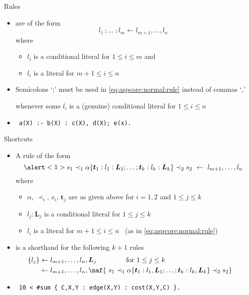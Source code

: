\begin{frame}{Rules}
  \begin{itemize}
  \item {} are of the form
    \begin{equation}
      \label{eq:aspcore:normal:rule}
       l_1\,;\dots\;;l_m\leftarrow  l_{m+1},\dots, l_n
    \end{equation}
    where
    \begin{itemize}
    \item $l_i$ is a conditional literal for $1\leq i\leq m$ and
    \item $l_i$ is a literal for $m+1\leq i\leq n$
    \end{itemize}
    \medskip
  \item<2->  Semicolons `;' must be used in \eqref{eq:aspcore:normal:rule} instead of commas `,' 
    \par whenever some $l_i$ is a (genuine) conditional literal for $1\leq i\leq n$
  \item<3->  \  \texttt{a(X) :- b(X) : c(X), d(X)\alert{;} e(x).}
  \end{itemize}
\end{frame}
\begin{frame}{Shortcuts}
  \begin{itemize}
  \item A rule of the form
    \[
    \alert<1>{s_1\prec_1\alpha\{\boldsymbol{t}_1:l_1:\boldsymbol{L}_1;\dots;\boldsymbol{t}_k:l_k:\boldsymbol{L}_k\}\prec_2 s_2}
    \ \leftarrow \ 
     l_{m+1},\dots, l_n
    \]
    where
    \begin{itemize}
    \item $\alpha$, $\prec_i$, $s_i$, $\boldsymbol{t}_j$ are as given above for $i=1,2$ and $1\leq j\leq k$
    \item $l_j:\boldsymbol{L}_j$ is a conditional literal for $1\leq j\leq k$
    \item $l_i$ is a literal for $m+1\leq i\leq n$ \ (as in \eqref{eq:aspcore:normal:rule})
    \end{itemize}
    \medskip
  \item<2->[] is a shorthand for the following $k+1$ rules
    \begin{align*}\hspace{-10pt}
      \{ l_j\}&\leftarrow  l_{m+1},\dots, l_n,\boldsymbol{L}_j\qquad\qquad\text{ for }1\leq j\leq k\\
                &\leftarrow  l_{m+1},\dots, l_n,\naf{~s_1\prec_1\alpha\{\boldsymbol{t}_1:l_1,\boldsymbol{L}_1;\dots;\boldsymbol{t}_k:l_k,\boldsymbol{L}_k\}\prec_2 s_2}
      \end{align*}
  \item<3->  \ 
    \texttt{10 < \#\texttt{sum} \{ C,X,Y : edge(X,Y) : cost(X,Y,C) \}.}
  \end{itemize}
\end{frame}
